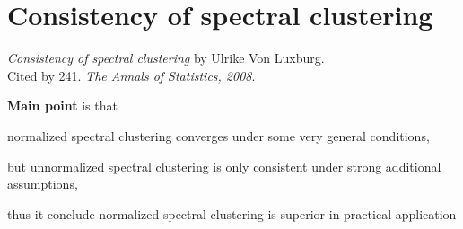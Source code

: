 \section{Consistency of spectral clustering}
\label{ch:ulrike2008}

\textit{Consistency of spectral clustering} by Ulrike Von Luxburg.\\
Cited by 241. \textit{The Annals of Statistics, 2008}.
\newline

\textbf{Main point} is that \begin{inparaenum}
\item normalized spectral clustering converges under some very general conditions, 
\item but unnormalized spectral clustering is only consistent under strong additional assumptions, 
\end{inparaenum} thus it conclude normalized spectral clustering is superior in practical application
